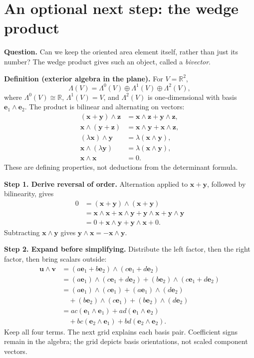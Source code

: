 \documentclass[11pt,letterpaper]{article}
\newcommand{\vect}[1]{\boldsymbol{#1}}
\newcommand{\R}{\mathbb{R}}
\newcommand{\tagword}[1]{\textbf{#1.}}
\begin{document}
\section{An optional next step: the wedge product}
\textbf{Question.} Can we keep the oriented area element itself, rather than just its number? The wedge product gives such an object, called a \emph{bivector}.

\tagword{Definition (exterior algebra in the plane)} For $V=\R^2$,
\[
\Lambda(V)=\Lambda^0(V)\oplus\Lambda^1(V)\oplus\Lambda^2(V),
\]
where $\Lambda^0(V)\cong\R$, $\Lambda^1(V)=V$, and $\Lambda^2(V)$ is one-dimensional with basis $\vect e_1\wedge\vect e_2$. The product is bilinear and alternating on vectors:
\[
\begin{aligned}
(\vect x+\vect y)\wedge\vect z&=\vect x\wedge\vect z+\vect y\wedge\vect z,\\
\vect x\wedge(\vect y+\vect z)&=\vect x\wedge\vect y+\vect x\wedge\vect z,\\
(\lambda\vect x)\wedge\vect y&=\lambda(\vect x\wedge\vect y),\\
\vect x\wedge(\lambda\vect y)&=\lambda(\vect x\wedge\vect y),\\
\vect x\wedge\vect x&=0.
\end{aligned}
\]
These are defining properties, not deductions from the determinant formula.

\textbf{Step 1. Derive reversal of order.} Alternation applied to $\vect x+\vect y$, followed by bilinearity, gives
\[
\begin{aligned}
0&=(\vect x+\vect y)\wedge(\vect x+\vect y)\\
&=\vect x\wedge\vect x+\vect x\wedge\vect y
+\vect y\wedge\vect x+\vect y\wedge\vect y\\
&=0+\vect x\wedge\vect y+\vect y\wedge\vect x+0.
\end{aligned}
\]
Subtracting $\vect x\wedge\vect y$ gives $\vect y\wedge\vect x=-\vect x\wedge\vect y$.

\textbf{Step 2. Expand before simplifying.} Distribute the left factor, then the right factor, then bring scalars outside:
\[
\begin{aligned}
\vect u\wedge\vect v
&=(a\vect e_1+b\vect e_2)\wedge(c\vect e_1+d\vect e_2)\\
&=(a\vect e_1)\wedge(c\vect e_1+d\vect e_2)
 +(b\vect e_2)\wedge(c\vect e_1+d\vect e_2)\\
&=(a\vect e_1)\wedge(c\vect e_1)+(a\vect e_1)\wedge(d\vect e_2)\\
&\quad+(b\vect e_2)\wedge(c\vect e_1)+(b\vect e_2)\wedge(d\vect e_2)\\
&=ac(\vect e_1\wedge\vect e_1)+ad(\vect e_1\wedge\vect e_2)\\
&\quad+bc(\vect e_2\wedge\vect e_1)+bd(\vect e_2\wedge\vect e_2).
\end{aligned}
\]
Keep all four terms. The next grid explains each basis pair. Coefficient signs remain in the algebra; the grid depicts basis orientations, not scaled component vectors.
\newpage
\end{document}
